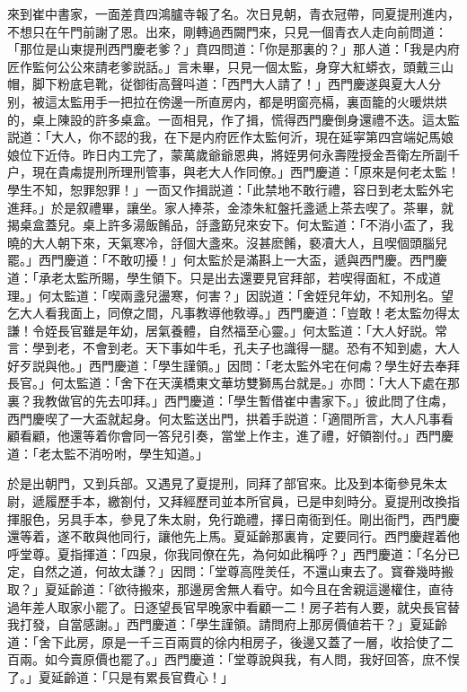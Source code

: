 來到崔中書家，一面差賁四鴻臚寺報了名。次日見朝，青衣冠帶，同夏提刑進内，不想只在午門前謝了恩。出來，剛轉過西闕門來，只見一個青衣人走向前問道：「那位是山東提刑西門慶老爹？」賁四問道：「你是那裏的？」那人道：「我是内府匠作監何公公來請老爹説話。」言未畢，只見一個太監，身穿大紅蟒衣，頭戴三山帽，脚下粉底皂靴，従御街高聲呌道：「西門大人請了！」西門慶遂與夏大人分别，被這太監用手一把拉在傍邊一所直房内，都是明窗亮槅，裏靣籠的火暖烘烘的，桌上陳設的許多桌盒。一靣相見，作了揖，慌得西門慶倒身還禮不迭。這太監説道：「大人，你不認的我，在下是内府匠作太監何沂，現在延寜第四宫端妃馬娘娘位下近侍。昨日内工完了，蒙萬歲爺爺恩典，將姪男何永壽陞授金吾衛左所副千户，現在貴䖏提刑所理刑管事，與老大人作同僚。」西門慶道：「原來是何老太監！學生不知，恕罪恕罪！」一靣又作揖説道：「此禁地不敢行禮，容日到老太監外宅進拜。」於是叙禮畢，讓坐。家人捧茶，金漆朱紅盤托盞遞上茶去喫了。茶畢，就揭桌盒蓋兒。桌上許多湯飯餚品，㧱盞筯兒來安下。何太監道：「不消小盃了，我曉的大人朝下來，天氣寒冷，㧱個大盞來。沒甚麽餚，褻凟大人，且喫個頭腦兒罷。」西門慶道：「不敢叨擾！」何太監於是滿斟上一大盃，遞與西門慶。西門慶道：「承老太監所賜，學生領下。只是出去還要見官拜部，若喫得面紅，不成道理。」何太監道：「喫兩盞兒盪寒，何害？」因説道：「舍姪兒年幼，不知刑名。望乞大人看我面上，同僚之間，凡事教導他敎導。」西門慶道：「豈敢！老太監勿得太謙！令姪長官雖是年幼，居氣養體，自然福至心靈。」何太監道：「大人好説。常言：學到老，不會到老。天下事如牛毛，孔夫子也識得一腿。恐有不知到處，大人好歹説與他。」西門慶道：「學生謹領。」因問：「老太監外宅在何䖏？學生好去奉拜長官。」何太監道：「舍下在天漢橋東文華坊雙獅馬台就是。」亦問：「大人下處在那裏？我教做官的先去叩拜。」西門慶道：「學生暫借崔中書家下。」彼此問了住䖏，西門慶喫了一大盃就起身。何太監送出門，拱着手説道：「適間所言，大人凡事看顧看顧，他還等着你會同一答兒引奏，當堂上作主，進了禮，好領劄付。」西門慶道：「老太監不消吩咐，學生知道。」

於是出朝門，又到兵部。又遇見了夏提刑，同拜了部官來。比及到本衛參見朱太尉，遞履歷手本，繳劄付，又拜經歷司並本所官員，已是申刻時分。夏提刑改換指揮服色，另具手本，參見了朱太尉，免行跪禮，擇日南衙到任。剛出衙門，西門慶還等着，遂不敢與他同行，讓他先上馬。夏延齡那裏肯，定要同行。西門慶趕着他呼堂尊。夏指揮道：「四泉，你我同僚在先，為何如此稱呼？」西門慶道：「名分已定，自然之道，何故太謙？」因問：「堂尊高陞羙任，不還山東去了。寳眷幾時搬取？」夏延齡道：「欲待搬來，那邊房舍無人看守。如今且在舍親這邊權住，直待過年差人取家小罷了。日逐望長官早晚家中看顧一二！房子若有人要，就央長官替我打發，自當感謝。」西門慶道：「學生謹領。請問府上那房價値若干？」夏延齡道：「舍下此房，原是一千三百兩買的徐内相房子，後邊又蓋了一層，收拾使了二百兩。如今賣原價也罷了。」西門慶道：「堂尊說與我，有人問，我好回答，庶不悮了。」夏延齡道：「只是有累長官費心！」

